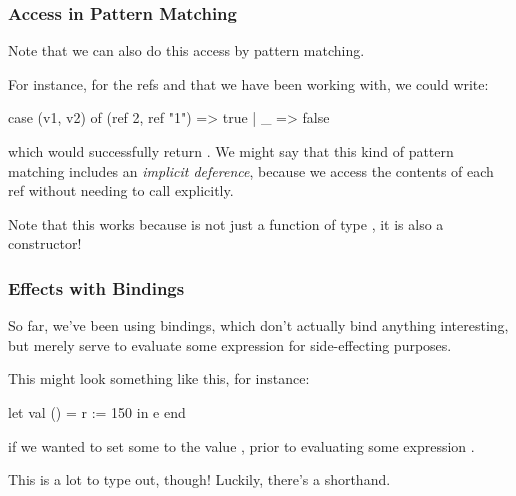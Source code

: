 \documentclass[aspectratio=169, handout]{beamer}
\begin{document}
\begin{frame}[fragile]
  \frametitle{ Access in Pattern Matching}

  Note that we can also do this \code{!} access by pattern matching.

  \pause
  \vspace{\fill}

  For instance, for the refs  and 
  that we have been working with, we could write:
  \begin{codeblock}
    case (v1, v2) of
      (ref 2, ref "1") => true
    | _ => false
  \end{codeblock}
  which would successfully return . We might say that this kind
  of pattern matching includes an \textit{implicit deference}, because we
  access the contents of each ref without needing to call \code{!} explicitly.

  \pause
  \vspace{\fill}

  Note that this works because  is not just a function of type
  , it is also a constructor!
\end{frame}

\begin{frame}[fragile]
  \frametitle{Effects with Bindings}

  So far, we've been using  bindings, which don't actually bind
  anything interesting, but merely serve to evaluate some expression for
  side-effecting purposes.

  \pause
  \vspace{\fill}

  This might look something like this, for instance:
  \begin{codeblock}
    let
      val () = r := 150
    in
      e
    end
  \end{codeblock}

  if we wanted to set some  to the value , prior to
  evaluating some expression .

  \pause
  \vspace{\fill}

  This is a lot to type out, though! Luckily, there's a shorthand.

\end{frame}
\end{document}
